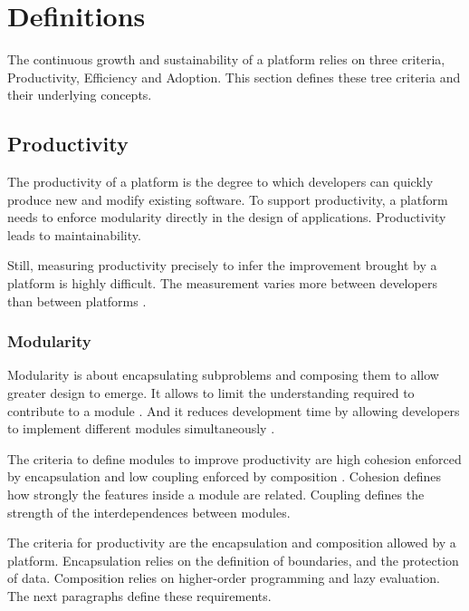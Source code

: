 \section{Definitions} \label{chapter3:definitions}

The continuous growth and sustainability of a platform relies on three criteria, Productivity, Efficiency and Adoption.
This section defines these tree criteria and their underlying concepts.

\subsection{Productivity} \label{chapter3:definitions:productivity}

The productivity of a platform is the degree to which developers can quickly produce new and modify existing software.
To support productivity, a platform needs to enforce modularity directly in the design of applications.
Productivity leads to maintainability.

Still, measuring productivity precisely to infer the improvement brought by a platform is highly difficult.
The measurement varies more between developers than between platforms \cite{Sackman1968}.

\subsubsection{Modularity} \label{chapter3:definitions:productivity:modularity}

Modularity is about encapsulating subproblems and composing them to allow greater design to emerge.
It allows to limit the understanding required to contribute to a module \cite{Stevens1974}.
And it reduces development time by allowing developers to implement different modules simultaneously \cite{Wong2009,Cataldo2006}.

The criteria to define modules to improve productivity are high cohesion enforced by encapsulation and low coupling enforced by composition \cite{Stevens1974}.
Cohesion defines how strongly the features inside a module are related.
Coupling defines the strength of the interdependences between modules.

\separator

The criteria for productivity are the encapsulation and composition allowed by a platform.
Encapsulation relies on the definition of boundaries, and the protection of data.
Composition relies on higher-order programming and lazy evaluation.
The next paragraphs define these requirements.

